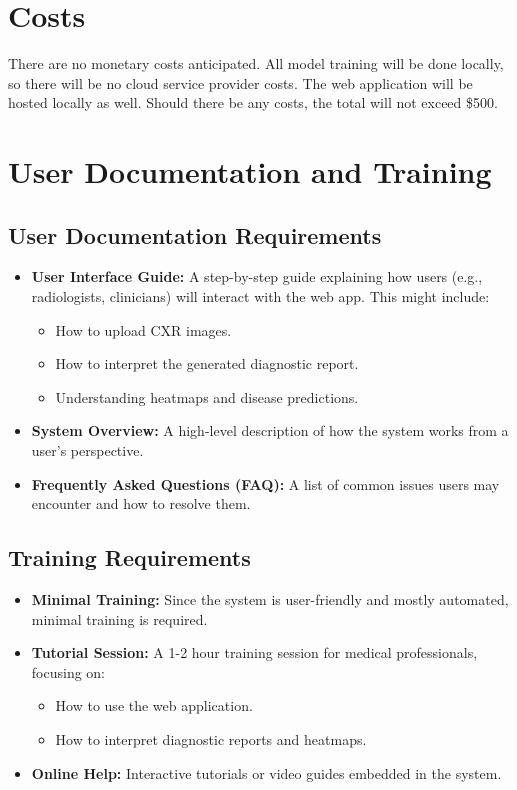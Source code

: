 \documentclass[12pt]{article}
\begin{document}
\section{Costs}
There are no monetary costs anticipated. All model training will be done locally, so there will be 
no cloud service provider costs. The web application will be hosted locally as well. Should there 
be any costs, the total will not exceed \$500.

\section{User Documentation and Training}
\subsection{User Documentation Requirements}
\begin{itemize}
    \item \textbf{User Interface Guide:} A step-by-step guide explaining how users (e.g., 
    radiologists, clinicians) will interact with the web app. This might include:
    \begin{itemize}
        \item How to upload CXR images.
        \item How to interpret the generated diagnostic report.
        \item Understanding heatmaps and disease predictions.
    \end{itemize}
    \item \textbf{System Overview:} A high-level description of how the system works from a user’s 
    perspective.
    \item \textbf{Frequently Asked Questions (FAQ):} A list of common issues users may encounter 
    and how to resolve them.
\end{itemize}

\subsection{Training Requirements}
\begin{itemize}
    \item \textbf{Minimal Training:} Since the system is user-friendly and mostly automated, 
    minimal training is required.
    \item \textbf{Tutorial Session:} A 1-2 hour training session for medical professionals, 
    focusing on:
    \begin{itemize}
        \item How to use the web application.
        \item How to interpret diagnostic reports and heatmaps.
    \end{itemize}
    \item \textbf{Online Help:} Interactive tutorials or video guides embedded in the system.
\end{itemize}
\end{document}
